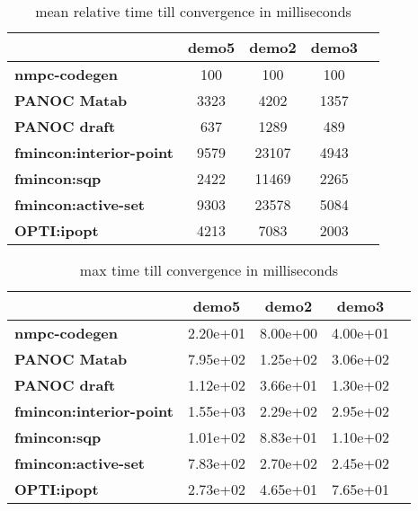 \begin{table}[H]
	\centering
	\begin{tabular}{|l|c|c|c|c|}
		\hline
		&\textbf{demo5}&\textbf{demo2}&\textbf{demo3}\\\hline
		\textbf{nmpc-codegen}&100&100&100\\\hline
		\textbf{PANOC Matab}&3323&4202&1357\\\hline
		\textbf{PANOC draft}&637&1289&489\\\hline
		\textbf{fmincon:interior-point}&9579&23107&4943\\\hline
		\textbf{fmincon:sqp}&2422&11469&2265\\\hline
		\textbf{fmincon:active-set}&9303&23578&5084\\\hline
		\textbf{OPTI:ipopt}&4213&7083&2003\\\hline
	\end{tabular}
	\caption{mean relative time till convergence in milliseconds}
	\label{tbl:mean relative time till convergence}
\end{table}

\begin{table}[H]
	\centering
	\begin{tabular}{|l|c|c|c|c|}
		\hline
		&\textbf{demo5}&\textbf{demo2}&\textbf{demo3}\\\hline
		\textbf{nmpc-codegen}&2.20e+01&8.00e+00&4.00e+01\\\hline
		\textbf{PANOC Matab}&7.95e+02&1.25e+02&3.06e+02\\\hline
		\textbf{PANOC draft}&1.12e+02&3.66e+01&1.30e+02\\\hline
		\textbf{fmincon:interior-point}&1.55e+03&2.29e+02&2.95e+02\\\hline
		\textbf{fmincon:sqp}&1.01e+02&8.83e+01&1.10e+02\\\hline
		\textbf{fmincon:active-set}&7.83e+02&2.70e+02&2.45e+02\\\hline
		\textbf{OPTI:ipopt}&2.73e+02&4.65e+01&7.65e+01\\\hline
	\end{tabular}
	\caption{max time till convergence in milliseconds}
	\label{tbl:max time till convergence}
\end{table}

